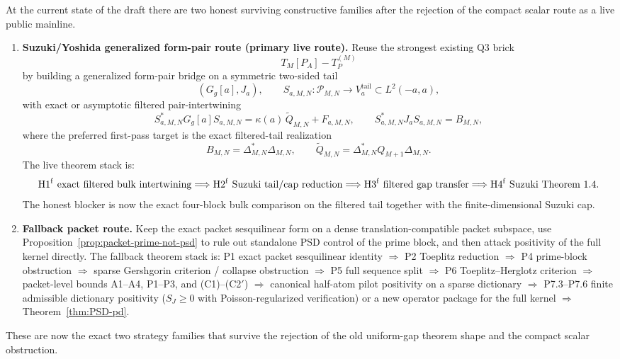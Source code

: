 \begin{remark}\label{rem:psd-pd-strategies}
At the current state of the draft there are two honest surviving constructive
families after the rejection of the compact scalar route as a live public
mainline.
\begin{enumerate}
  \item \textbf{Suzuki/Yoshida generalized form-pair route (primary live route).}
  Reuse the strongest existing Q3 brick
  \[
    T_M[P_A]-T_P^{(M)}
  \]
  by building a generalized form-pair bridge on a symmetric two-sided tail
  \[
    (G_g[a],J_a),\qquad S_{a,M,N}:\mathcal P_{M,N}\to V_a^{\mathrm{tail}}\subset L^2(-a,a),
  \]
  with exact or asymptotic filtered pair-intertwining
  \[
    S_{a,M,N}^*G_g[a]S_{a,M,N}
    =
    \kappa(a)\,\widetilde Q_{M,N}+F_{a,M,N},
    \qquad
    S_{a,M,N}^*J_aS_{a,M,N}=B_{M,N},
  \]
  where the preferred first-pass target is the exact filtered-tail realization
  \[
    B_{M,N}=\Delta_{M,N}^*\Delta_{M,N},
    \qquad
    \widetilde Q_{M,N}=\Delta_{M,N}^*Q_{M+1}\Delta_{M,N}.
  \]
  The live theorem stack is:
  \[
    \textup{H1}^{\mathrm f}\ \textup{exact filtered bulk intertwining}
    \Longrightarrow
    \textup{H2}^{\mathrm f}\ \textup{Suzuki tail/cap reduction}
    \Longrightarrow
    \textup{H3}^{\mathrm f}\ \textup{filtered gap transfer}
    \Longrightarrow
    \textup{H4}^{\mathrm f}\ \textup{Suzuki Theorem 1.4}.
  \]
  The honest blocker is now the exact four-block bulk comparison on the
  filtered tail together with the finite-dimensional Suzuki cap.
  \item \textbf{Fallback packet route.} Keep the exact packet sesquilinear form
  on a dense translation-compatible packet subspace, use
  Proposition~\ref{prop:packet-prime-not-psd} to rule out standalone PSD control
  of the prime block, and then attack positivity of the full kernel directly.
  The fallback theorem stack is:
  \textup{P1} exact packet sesquilinear identity
  $\Longrightarrow$
  \textup{P2} Toeplitz reduction
  $\Longrightarrow$
  \textup{P4} prime-block obstruction
  $\Longrightarrow$
  sparse Gershgorin criterion / collapse obstruction
  $\Longrightarrow$
  \textup{P5} full sequence split
  $\Longrightarrow$
  \textup{P6} Toeplitz--Herglotz criterion
  $\Longrightarrow$
  packet-level bounds \textup{A1}--\textup{A4}, \textup{P1}--\textup{P3},
  and \textup{(C1)}--\textup{(C2$'$)}
  $\Longrightarrow$
  canonical half-atom pilot positivity on a sparse dictionary
  $\Longrightarrow$
  \textup{P7.3}--\textup{P7.6} finite admissible dictionary positivity
  ($S_J\ge0$ with Poisson-regularized verification) or a new operator package for the full kernel
  $\Longrightarrow$
  Theorem~\ref{thm:PSD-pd}.
\end{enumerate}
These are now the exact two strategy families that survive the rejection of the
old uniform-gap theorem shape and the compact scalar obstruction.
\end{remark}

